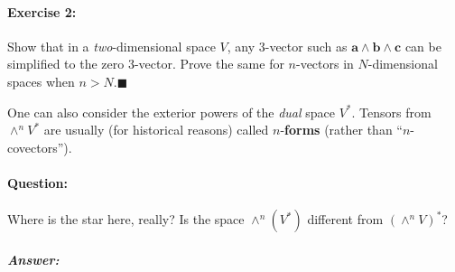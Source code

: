 \paragraph{Exercise 2:}

Show that in a \emph{two}-dimensional space $V$, any 3-vector such
as $\mathbf{a}\wedge\mathbf{b}\wedge\mathbf{c}$ can be simplified
to the zero 3-vector. Prove the same for $n$-vectors in $N$-dimensional
spaces when $n>N$.\hfill{}$\blacksquare$

One can also consider the exterior powers of the \emph{dual} space
$V^{*}$. Tensors from $\wedge^{n}V^{*}$ are usually (for historical
reasons) called $n$-\textbf{forms} (rather than
{}``$n$-covectors'').


\paragraph{Question:}

Where is the star here, really? Is the space $\wedge^{n}\left(V^{*}\right)$
different from $\left(\wedge^{n}V\right)^{*}$?


\subparagraph{Answer:}

